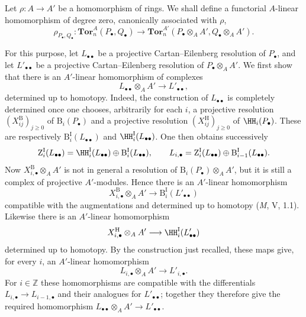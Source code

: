 \begin{env}[6.3.8]
\label{III.6.3.8}
Let $\rho:A\longrightarrow A'$ be a homomorphism of rings.  We
shall define a functorial $A$-linear homomorphism of degree zero,
canonically associated with $\rho$,
\[
  \rho_{P_\bullet,Q_\bullet}:
  \mathbf{Tor}_n^A(P_\bullet,Q_\bullet)
  \longrightarrow
  \mathbf{Tor}_n^{A'}
  (P_\bullet\otimes_AA',Q_\bullet\otimes_AA').
  \tag{6.3.8.1}\label{III.6.3.8.1}
\]

For this purpose, let $L_{\bullet\bullet}$ be a projective
Cartan--Eilenberg resolution of $P_\bullet$, and let
$L'_{\bullet\bullet}$ be a projective Cartan--Eilenberg resolution
of $P_\bullet\otimes_AA'$.  We first show that there is an
$A'$-linear homomorphism of complexes
\[
  L_{\bullet\bullet}\otimes_AA'
  \longrightarrow L'_{\bullet\bullet},
\]
determined up to homotopy.  Indeed, the construction of
$L_{\bullet\bullet}$ is completely determined once one chooses,
arbitrarily for each $i$, a projective resolution
$(X_{ij}^{\mathrm B})_{j\geq0}$ of $\mathrm B_i(P_\bullet)$ and a
projective resolution $(X_{ij}^{\mathrm H})_{j\geq0}$ of
$\HH_i(P_\bullet)$.  These are respectively
$\mathrm B_i^{\mathrm I}(L_{\bullet\bullet})$ and
$\HH_i^{\mathrm I}(L_{\bullet\bullet})$.  One then obtains
successively
\[
  \mathrm Z_i^{\mathrm I}(L_{\bullet\bullet})
  =
  \HH_i^{\mathrm I}(L_{\bullet\bullet})
  \oplus
  \mathrm B_i^{\mathrm I}(L_{\bullet\bullet}),
  \qquad
  L_{i,\bullet}
  =
  \mathrm Z_i^{\mathrm I}(L_{\bullet\bullet})
  \oplus
  \mathrm B_{i-1}^{\mathrm I}(L_{\bullet\bullet}).
\]
Now $X_{i,\bullet}^{\mathrm B}\otimes_AA'$ is not in general a
resolution of $\mathrm B_i(P_\bullet)\otimes_AA'$, but it is still
a complex of projective $A'$-modules.  Hence there is an
$A'$-linear homomorphism
\[
  X_{i,\bullet}^{\mathrm B}\otimes_AA'
  \longrightarrow
  \mathrm B_i^{\mathrm I}(L'_{\bullet\bullet})
\]
compatible with the augmentations and determined up to homotopy
(\emph{M}, V, 1.1).  Likewise there is an $A'$-linear homomorphism
\[
  X_{i,\bullet}^{\mathrm H}\otimes_AA'
  \longrightarrow
  \HH_i^{\mathrm I}(L'_{\bullet\bullet})
\]
determined up to homotopy.  By the construction just recalled,
these maps give, for every $i$, an $A'$-linear homomorphism
\[
  L_{i,\bullet}\otimes_AA'\longrightarrow L'_{i,\bullet}.
\]
For $i\in\mathbb Z$ these homomorphisms are compatible with the
differentials $L_{i,\bullet}\longrightarrow L_{i-1,\bullet}$ and
their analogues for $L'_{\bullet\bullet}$; together they therefore
give the required homomorphism
$L_{\bullet\bullet}\otimes_AA'\longrightarrow L'_{\bullet\bullet}$.


\end{env}
